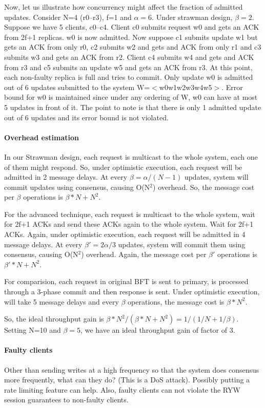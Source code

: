 \documentclass[twocolumn,10pt]{article}
\begin{document}
{Now, let us illustrate how concurrency might affect the fraction of 
admitted updates. Consider N=4 (r0--r3), f=1 and $\alpha=6$. Under strawman design,
$\beta=2$. Suppose we have 5 clients, c0--c4. Client c0 submits request w0
and gets an ACK from 2f+1 replicas. w0 is now admitted. Now suppose c1 submits
update w1 but gets an ACK from only r0, c2 submits w2 and gets and ACK from
only r1 and c3 submits w3 and gets an ACK from r2. Client c4 submits w4
and gets and ACK from r3 and c5 submits an update w5 and gets an ACK from r3.
At this point, each non-faulty replica is full and tries to commit. Only update
w0 is admitted out of 6 updates submitted to the system W=$<$w0w1w2w3w4w5$>$.
Error bound for w0 is maintained since under any ordering of W, w0 can have
at most 5 updates in front of it. The point to note is that there is only 1 admitted update out
of 6 updates and its error bound is not violated. 

\paragraph{Overhead estimation} In our Strawman design, each request is multicast
to the whole system, each one of them might respond. So, under optimistic
execution, each request will be admitted in 2 message delays. At every $\beta=\alpha/(N-1)$
updates, system will commit updates using consensus, causing O(N$^2$)
overhead. So, the message cost per $\beta$ operations is $\beta*N+N^2$.

For the advanced technique, each request is multicast to the whole
system, wait for 2f+1 ACKs and send these ACKs again to the whole system.
Wait for 2f+1 ACKs. Again, under optimistic execution, each request
will be admitted in 4 message delays. At every $\beta'=2\alpha/3$ updates, system will commit them
using consensus, causing O(N$^2$) overhead. Again, the message cost per
$\beta'$ operations is $\beta'*N+N^2$.

For comparision, each request in original BFT is sent to primary, is processed
through a 3-phase commit and then response is sent. Under optimistic execution,
will take 5 message delays and every $\beta$ operations, the 
message cost is $\beta*N^2$. 

So, the ideal throughput gain is $\beta*N^2/(\beta*N+N^2)=1/(1/N+1/\beta)$.
Setting N=10 and $\beta=5$, we have an ideal throughput gain of factor of 3.
 
\paragraph{Faulty clients}
Other than sending writes at a high frequency so
that the system does consensus more frequently, what can they do? (This is
a DoS attack). Possibly
putting a rate limiting feature can help. Also, faulty clients can not
violate the RYW session guarantees to non-faulty clients.

}
\end{document}
